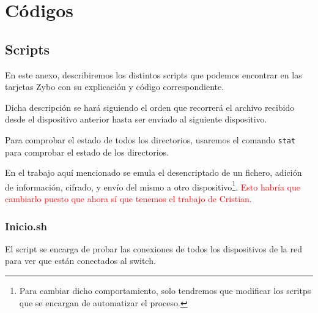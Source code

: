 \chapter{Códigos}
\section{Scripts}
En este anexo, describiremos los distintos scripts que podemos encontrar en las tarjetas Zybo con su explicación y código correspondiente.

Dicha descripción se hará siguiendo el orden que recorrerá el archivo recibido desde el dispositivo anterior hasta ser enviado al siguiente dispositivo.

Para comprobar el estado de todos los directorios, usaremos el comando \texttt{stat} para comprobar el estado de los directorios.

En el trabajo aquí mencionado se emula el desencriptado de un fichero, adición de información, cifrado, y envío del mismo a otro dispositivo\footnote{Para cambiar dicho comportamiento, solo tendremos que modificar los scritps que se encargan de automatizar el proceso.}. \textcolor{red}{Esto habría que cambiarlo puesto que ahora sí que tenemos el trabajo de Cristian.}

\newpage
\subsection{Inicio.sh}
El script se encarga de probar las conexiones de todos los dispositivos de la red para ver que están conectados al switch.

